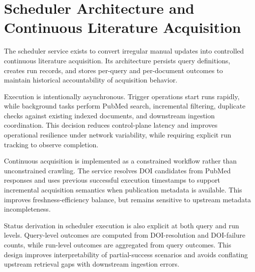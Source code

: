 \section{Scheduler Architecture and Continuous Literature Acquisition}

The scheduler service exists to convert irregular manual updates into controlled continuous literature acquisition. Its architecture persists query definitions, creates run records, and stores per-query and per-document outcomes to maintain historical accountability of acquisition behavior.

Execution is intentionally asynchronous. Trigger operations start runs rapidly, while background tasks perform PubMed search, incremental filtering, duplicate checks against existing indexed documents, and downstream ingestion coordination. This decision reduces control-plane latency and improves operational resilience under network variability, while requiring explicit run tracking to observe completion.

Continuous acquisition is implemented as a constrained workflow rather than unconstrained crawling. The service resolves DOI candidates from PubMed responses and uses previous successful execution timestamps to support incremental acquisition semantics when publication metadata is available. This improves freshness-efficiency balance, but remains sensitive to upstream metadata incompleteness.

Status derivation in scheduler execution is also explicit at both query and run levels. Query-level outcomes are computed from DOI-resolution and DOI-failure counts, while run-level outcomes are aggregated from query outcomes. This design improves interpretability of partial-success scenarios and avoids conflating upstream retrieval gaps with downstream ingestion errors.

